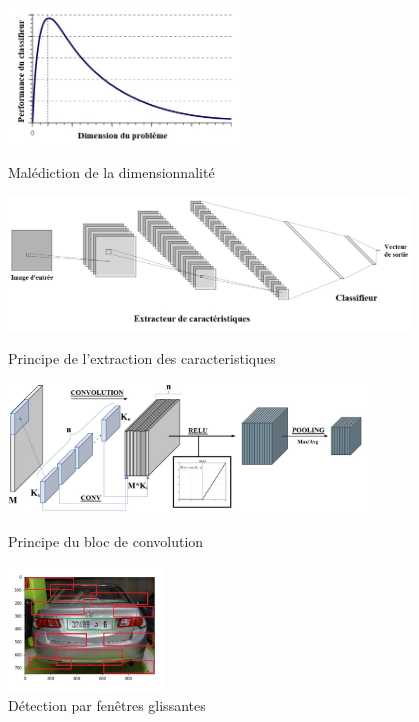 \begin{frame}
\centering
\begin{figure}
    \begin{overprint}
        \captionsetup{justification=centering}
        \centering\includegraphics[width=0.55\textwidth]{figures/Malediction.PNG}\caption{Malédiction de la dimensionnalité}
        \centering\includegraphics[width=0.95\textwidth]{figures/Extracteur.PNG}\caption{Principe de l'extraction des caracteristiques}
        \centering\includegraphics[width=0.85\textwidth]{figures/Conv_RELU_Pool.PNG}\caption{Principe du bloc de convolution}
        \centering\includegraphics[width=0.37\textwidth]{figures/RCNN.PNG}\caption{Détection par fenêtres glissantes}
    \end{overprint}
\end{figure}
\end{frame}



